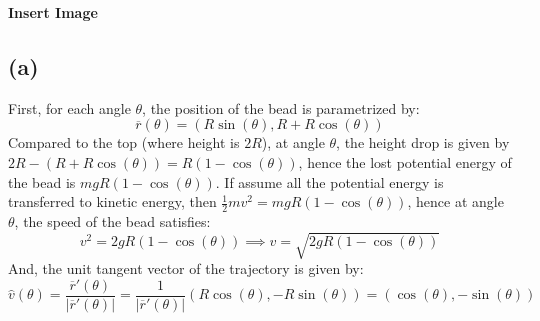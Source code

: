 \documentclass{article}
\newcommand{\br}{\overline{r}}
\newcommand{\bF}{\overline{F}}
\begin{document}

\textbf{Insert Image}
\subsection*{(a)}
First, for each angle $\theta$, the position of the bead is parametrized by:
$$\br(\theta)=(R\sin(\theta), R+R\cos(\theta))$$
Compared to the top (where height is $2R$), at angle $\theta$, the height drop is given by $2R-(R+R\cos(\theta)) = R(1-\cos(\theta))$, hence the lost potential energy of the bead is $mgR(1-\cos(\theta))$. If assume all the potential energy is transferred to kinetic energy, then $\frac{1}{2}mv^2 = mgR(1-\cos(\theta))$, hence at angle $\theta$, the speed of the bead satisfies:
$$v^2 = 2gR(1-\cos(\theta))\implies v=\sqrt{2gR(1-\cos(\theta))}$$
And, the unit tangent vector of the trajectory is given by:
$$\hat{v}(\theta)=\frac{\br'(\theta)}{|\br'(\theta)|} = \frac{1}{|\br'(\theta)|}(R\cos(\theta), -R\sin(\theta)) = (\cos(\theta),-\sin(\theta))$$
\end{document}
